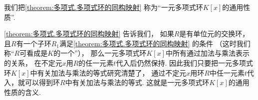 我们把\cref{theorem:多项式.多项式环的同构映射}
称为“一元多项式环\(K[x]\)的通用性质”.

\cref{theorem:多项式.多项式环的同构映射} 告诉我们，
如果\(R\)是有单位元的交换环，
且\(R\)有一个子环\(R_1\)满足\cref{theorem:多项式.多项式环的同构映射} 的条件
（这时我们称“\(R\)可看成是\(K\)的一个”），
那么一元多项式环\(K[x]\)中所有通过加法与乘法表示的关系，
在不定元\(x\)用\(R\)的任一元素\(t\)代入后仍然保持.
因此我们只要把一元多项式环\(K[x]\)中有关加法与乘法的等式研究清楚了，
通过不定元\(x\)用环\(R\)中任一元素\(t\)代入，就可以得到环\(R\)中有关加法与乘法的等式.
这就是一元多项式环\(K[x]\)的通用性质的含义.
